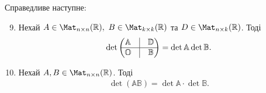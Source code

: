 \documentclass{math_library}
\begin{document}
\begin{proposition}
Справедливе наступне:
\begin{enumerate}[nosep,wide=0pt,label={\arabic*)}]
\setcounter{enumi}{8}
\item Нехай $A \in \Mat_{n \times n}(\mathbb{R}),\ B \in \Mat_{k \times k}(\mathbb{R})$ та $D \in \Mat_{n \times k}(\mathbb{R})$. Тоді
\begin{align*}
\det \begin{pmatrix}
 \mathbb{A} & \vline & \mathbb{D} \\
 \hline
 \mathbb{O} & \vline & \mathbb{B}
\end{pmatrix} = \det \mathbb{A} \det \mathbb{B}.
\end{align*}

\item Нехай $A,B \in \Mat_{n \times n}(\mathbb{R})$. Тоді
\begin{align*}
\det (\mathbb{A} \mathbb{B}) = \det \mathbb{A} \cdot \det \mathbb{B}.
\end{align*}
\end{enumerate}
\end{proposition}
\end{document}
